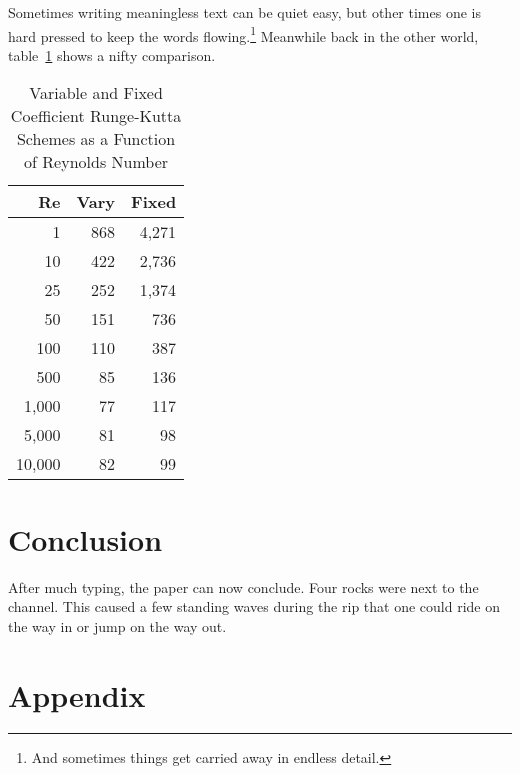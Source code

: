 \documentclass[]{aiaa-tc}%
\begin{document}
Sometimes writing meaningless text can be quiet easy, but other times
one is hard pressed to keep the words flowing.\footnote{And sometimes
things get carried away in endless detail.}
Meanwhile back in the other world, table~\ref{t:scheme_comparison} shows
a nifty comparison.
\begin{table}%
 \begin{center}
  \caption{Variable and Fixed Coefficient Runge-Kutta Schemes as a
           Function of Reynolds Number}
  \label{t:scheme_comparison}
  \begin{tabular}{rrr}
       Re & Vary & Fixed \\\hline
        1 &  868 & 4,271 \\
       10 &  422 & 2,736 \\
       25 &  252 & 1,374 \\
       50 &  151 &   736 \\
      100 &  110 &   387 \\
      500 &   85 &   136 \\
    1,000 &   77 &   117 \\
    5,000 &   81 &    98 \\
   10,000 &   82 &    99
  \end{tabular}
 \end{center}
\end{table}

\section{Conclusion}

After much typing, the paper can now conclude.
Four rocks were next to the channel.
This caused a few standing waves during the rip that one could ride on
the way in or jump on the way out.

\section{Appendix}
\label{APP:Code}
\end{document}
